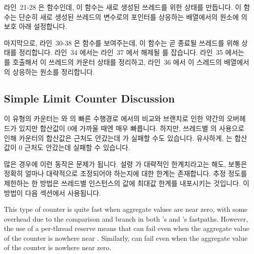 라인~21-28 은  함수인데, 이 함수는 새로 생성된
쓰레드를 위한 상태를 만듭니다.
이 함수는 단순히 새로 생성된 쓰레드의  변수로의 포인터를 상응하는
 배열에서의 원소에  의 보호 아래 설정합니다.

마지막으로, 라인~30-38 은  함수를 보여주는데, 이
함수는 곧 종료될 쓰레드를 위해 상태를 정리합니다.
라인~34 에서는 라인~37 에서 해제될  를 잡습니다.
라인~35 에서는  를 호출해서 이 쓰레드의 카운터 상태를
정리하고, 라인~36 에서 이 스레드의  배열에서의 상응하는 원소를
정리합니다.

\subsection{Simple Limit Counter Discussion}
\label{sec:count:Simple Limit Counter Discussion}

이 유형의 카운터는  와  의 빠른 수행경로 에서의
비교와 브랜치로 인한 약간의 오버헤드가 있지만 합산값이 0에 가까울 때엔 매우
빠릅니다.
하지만, 쓰레드별  의 사용으로 인해 카운터의 합산값은
 근처도 안갔는데  가 실패할 수도 있습니다.
유사하게,  는 합산값이 0 근처도 안갔는데 실패할 수 있습니다.

많은 경우에 이런 동작은 문제가 됩니다.
설령  가 대략적인 한계치라고는 해도, 보통은 정확히 얼마나
대략적으로 조정되어야 하는지에 대한 한계는 존재합니다.
추정 정도를 제한하는 한 방법은 쓰레드별  인스턴스의 값에 최대값
한계를 내포시키는 것입니다.
이 방법이 다음 섹션에서 사용됩니다.
\iffalse

This type of counter is quite fast when aggregate values are near zero,
with some overhead due to the comparison and branch in both
's and 's fastpaths.
However, the use of a per-thread  reserve means that
 can fail even when
the aggregate value of the counter is nowhere near .
Similarly,  can fail
even when the aggregate value of the counter is nowhere near zero.

